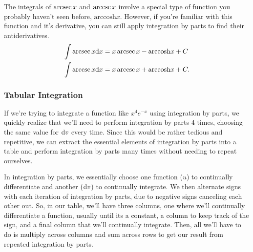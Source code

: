 The integrals of $\operatorname{arcsec}{x}$ and $\operatorname{arccsc}{x}$ involve a special type of function you probably haven't seen before, $\text{arccosh}{x}$.
However, if you're familiar with this function and it's derivative, you can still apply integration by parts to find their antiderivatives.
\begin{align*}
	\int{\operatorname{arcsec}{x}\mathrm{d} x} &= x\operatorname{arcsec}{x} - \text{arccosh}{x} + C \\
	\int{\operatorname{arccsc}{x}\mathrm{d} x} &= x\operatorname{arccsc}{x} + \text{arccosh}{x} + C.
\end{align*}

\subsubsection{Tabular Integration}
If we're trying to integrate a function like $x^4e^{-x}$ using integration by parts, we quickly realize that we'll need to perform integration by parts 4 times, choosing the same value for $\mathrm{d} v$ every time.
Since this would be rather tedious and repetitive, we can extract the essential elements of integration by parts into a table and perform integration by parts many times without needing to repeat ourselves.


In integration by parts, we essentially choose one function ($u$) to continually differentiate and another ($\mathrm{d} v$) to continually integrate.
We then alternate signs with each iteration of integration by parts, due to negative signs canceling each other out.
So, in our table, we'll have three columns, one where we'll continually differentiate a function, usually until its a constant, a column to keep track of the sign, and a final column that we'll continually integrate.
Then, all we'll have to do is multiply across columns and sum across rows to get our result from repeated integration by parts.

